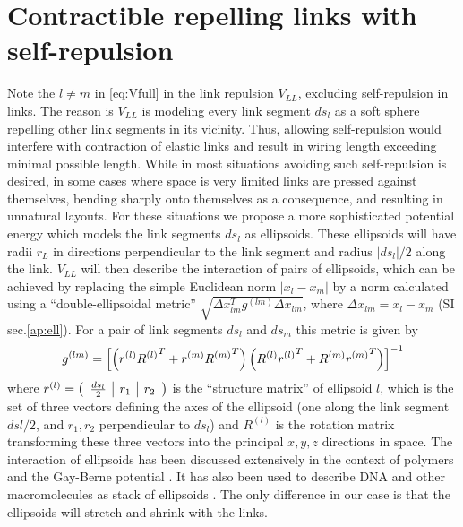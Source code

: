 \documentclass[nofootinbib,preprint,floatfix,titlepage,superscriptaddress]{revtex4} %
\begin{document}
\section{Contractible repelling links with self-repulsion\label{ap:ell}}
Note the $l\ne m $ in \eqref{eq:Vfull} in the link repulsion $V_{LL}$, excluding self-repulsion in links. 
The reason is $V_{LL}$ is modeling every link segment $ds_l$ as a soft sphere repelling other link segments in its vicinity.
Thus, allowing self-repulsion would interfere with contraction of elastic links and result in wiring length exceeding minimal possible length. 
While in most situations avoiding such self-repulsion is desired, in some cases where space is very limited links are pressed against themselves, bending sharply onto themselves as a consequence, and resulting in unnatural layouts. 
For these situations we propose a more sophisticated potential energy which models the link segments $ds_l$ as ellipsoids. 
These ellipsoids will have radii $r_L$ in directions perpendicular to the link segment and radius $|ds_l|/2$ along the link. 
$V_{LL}$ will then describe the interaction of pairs of ellipsoids, which can be achieved by replacing the simple Euclidean norm $|x_l-x_m|%
$ by a norm calculated using a ``double-ellipsoidal metric'' $\sqrt{\Delta x_{lm}^Tg^{(lm)}\Delta x_{lm}}$, where $\Delta x_{lm} = x_l-x_m$ (SI sec.\ref{ap:ell}). 
For a pair of link segments $ds_l$ and $ds_m$ this metric is given by 
\begin{align}
    g^{(lm)} = \left[\left(r^{(l)}{R^{(l)}}^T+ r^{(m)}{R^{(m)}}^T\right) \left(R^{(l)}{r^{(l)}}^T+ R^{(m)}{r^{(m)}}^T\right) \right]^{-1}
    \label{eq:g-ell}
\end{align}
where $r^{(l)} = \left(\begin{array}{c|c|c}{ds_l\over2} & r_{1} &r_{2}\end{array}
    \right)$ 
is the ``structure matrix'' of ellipsoid $l$, which is the set of three vectors defining the axes of the ellipsoid (one along the link segment $dsl/2$, and $r_1, r_2$ perpendicular to $ds_l$) and $R^{(l)}$ is the rotation matrix transforming these three vectors into the principal $x,y,z$ directions in space. 
The interaction of ellipsoids has been discussed extensively in the context of polymers and the Gay-Berne potential \citep{gay1981modification,berne1972gaussian,everaers2003interaction}. 
It has also been used to describe DNA and other macromolecules as stack of ellipsoids \citep{babadi2006coarse,mergell2003modeling,cleaver1996extension}.
The only difference in our case is that the ellipsoids will stretch and shrink with the links. 
\end{document}
